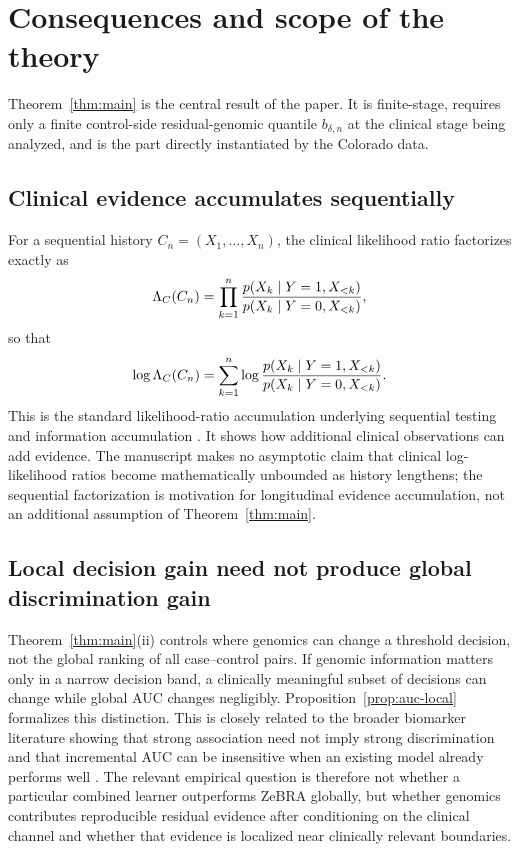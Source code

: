 \section{Consequences and scope of the theory}

Theorem~\ref{thm:main} is the central result of the paper. It is finite-stage, requires only a finite control-side residual-genomic quantile $b_{\delta,n}$ at the clinical stage being analyzed, and is the part directly instantiated by the Colorado data.

\subsection{Clinical evidence accumulates sequentially}

For a sequential history $C_n=(X_1,\ldots,X_n)$, the clinical likelihood ratio factorizes exactly as
\begin{equation}
\Lambda_C(C_n)
=\prod_{k=1}^{n}
\frac{p(X_k\mid Y=1,X_{<k})}
     {p(X_k\mid Y=0,X_{<k})},
\label{eq:sequentialLR}
\end{equation}
so that
\begin{equation}
\log\Lambda_C(C_n)
=\sum_{k=1}^{n}
\log
\frac{p(X_k\mid Y=1,X_{<k})}
     {p(X_k\mid Y=0,X_{<k})}.
\label{eq:sequentiallogLR}
\end{equation}
This is the standard likelihood-ratio accumulation underlying sequential testing and information accumulation \cite{Wald1945,CoverThomas2006}. It shows how additional clinical observations can add evidence. The manuscript makes no asymptotic claim that clinical log-likelihood ratios become mathematically unbounded as history lengthens; the sequential factorization is motivation for longitudinal evidence accumulation, not an additional assumption of Theorem~\ref{thm:main}.

\subsection{Local decision gain need not produce global discrimination gain}

Theorem~\ref{thm:main}(ii) controls where genomics can change a threshold decision, not the global ranking of all case--control pairs. If genomic information matters only in a narrow decision band, a clinically meaningful subset of decisions can change while global AUC changes negligibly. Proposition~\ref{prop:auc-local} formalizes this distinction. This is closely related to the broader biomarker literature showing that strong association need not imply strong discrimination and that incremental AUC can be insensitive when an existing model already performs well \cite{Pepe2004,Pencina2012,Steyerberg2012}. The relevant empirical question is therefore not whether a particular combined learner outperforms ZeBRA globally, but whether genomics contributes reproducible residual evidence after conditioning on the clinical channel and whether that evidence is localized near clinically relevant boundaries.

